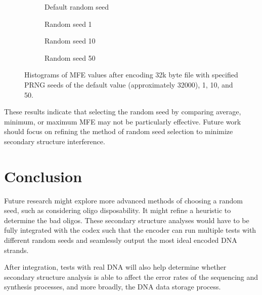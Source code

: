 \documentclass{article}
\begin{document}
\begin{figure}[!h]
\centering
\begin{subfigure}{.5\textwidth}
  \centering
  
  \caption{Default random seed}
  \label{fig:histogram_a}
\end{subfigure}%
\begin{subfigure}{.5\textwidth}
  \centering
  
  \caption{Random seed 1}
  \label{fig:histogram_b}
\end{subfigure}

\begin{subfigure}{.5\textwidth}
  \centering
  
  \caption{Random seed 10}
  \label{fig:histogram_c}
\end{subfigure}%
\begin{subfigure}{.5\textwidth}
  \centering
  
  \caption{Random seed 50}
  \label{fig:histogram_d}
\end{subfigure}
\caption{Histograms of MFE values after encoding 32k byte file with specified PRNG seeds of the default value (approximately 32000), 1, 10, and 50.}
\label{fig:test}
\end{figure}


These results indicate that selecting the random seed by comparing average, minimum, or maximum MFE may not be particularly effective. Future work should focus on refining the method of random seed selection to minimize secondary structure interference.


\section{Conclusion}

Future research might explore more advanced methods of choosing a random seed, such as considering oligo disposability. It might refine a heuristic to determine the bad oligos. These secondary structure analyses would have to be fully integrated with the codex such that the encoder can run multiple tests with different random seeds and seamlessly output the most ideal encoded DNA strands. 

After integration, tests with real DNA will also help determine whether secondary structure analysis is able to affect the error rates of the sequencing and synthesis processes, and more broadly, the DNA data storage process.
\end{document}
